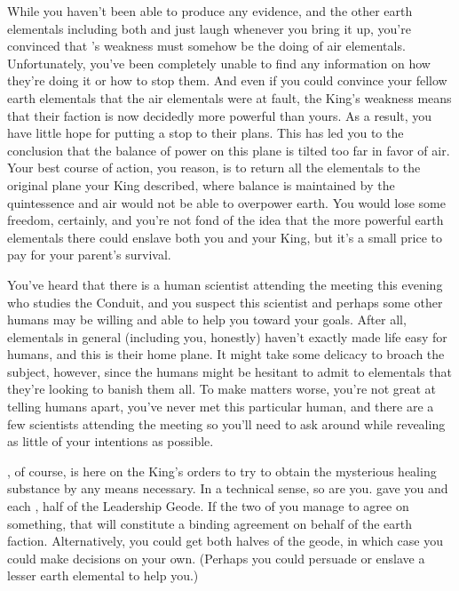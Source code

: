 \documentclass[char]{elementals}
\begin{document}
While you haven't been able to produce any evidence, and the other earth elementals including both \cEarthKing{} and \cLoyal{} just laugh whenever you bring it up, you're convinced that \cEarthKing{}'s weakness must somehow be the doing of air elementals.  Unfortunately, you've been completely unable to find any information on how they're doing it or how to stop them.  And even if you could convince your fellow earth elementals that the air elementals were at fault, the King's weakness means that their faction is now decidedly more powerful than yours.  As a result, you have little hope for putting a stop to their plans.  This has led you to the conclusion that the balance of power on this plane is tilted too far in favor of air.  Your best course of action, you reason, is to return all the elementals to the original plane your King described, where balance is maintained by the quintessence and air would not be able to overpower earth.  You would lose some freedom, certainly, and you're not fond of the idea that the more powerful earth elementals there could enslave both you and your King, but it's a small price to pay for your parent's survival.

You've heard that there is a human scientist attending the meeting this evening who studies the Conduit, and you suspect this scientist and perhaps some other humans may be willing and able to help you toward your goals.  After all, elementals in general (including you, honestly) haven't exactly made life easy for humans, and this is their home plane.  It might take some delicacy to broach the subject, however, since  the humans might be hesitant to admit to elementals that they're looking to banish them all.  To make matters worse, you're not great at telling humans apart, you've never met this particular human, and there are a few scientists attending the meeting so you'll need to ask around while revealing as little of your intentions as possible.

\cLoyal{}, of course, is here on the King's orders to try to obtain the mysterious healing substance by any means necessary.  In a technical sense, so are you.  \cEarthKing{} gave you and \cLoyal{} each \iHalfGeode{}, half of the Leadership Geode.  If the two of you manage to agree on something, that will constitute a binding agreement on behalf of the earth faction.  Alternatively, you could get both halves of the geode, in which case you could make decisions on your own.  (Perhaps you could persuade or enslave a lesser earth elemental to help you.)
\end{document}
